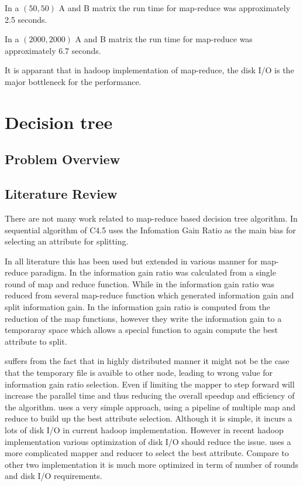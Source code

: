 \documentclass{article}
\begin{document}
In a $(50,50)$ A and B matrix the run time for map-reduce was approximately 2.5 seconds.

In a $(2000,2000)$ A and B matrix the run time for map-reduce was approximately 6.7 seconds.

It is apparant that in hadoop implementation of map-reduce, the disk I/O is the major bottleneck for the performance.

\section{Decision tree}

\subsection{Problem Overview}
\subsection{Literature Review}
There are not many work related to map-reduce based decision tree algorithm. 
\BlankLine In sequential algorithm of C4.5 uses the Infomation Gain Ratio as the main bias for selecting an attribute for splitting. 

In all literature this has been used but extended in various manner for map-reduce paradigm. In \cite{c452017} the information gain ratio was calculated from a single round of map and reduce function. While in \cite{c45cn} the information gain ratio was reduced from several map-reduce function which generated information gain and split information gain. In \cite {c45in} the information gain ratio is computed from the reduction of the map functions, however they write the information gain to a temporaray space which allows a special function to again compute the best attribute to split.

\cite{c45in} suffers from the fact that in highly distributed manner it might not be the case that the temporary file is avaible to other node, leading to wrong value for information gain ratio selection. Even if limiting the mapper to step forward will increase the parallel time and thus reducing the overall speedup and efficiency of the algorithm. \cite{c45cn} uses a very simple approach, using a pipeline of multiple map and reduce to build up the best attribute selection. Although it is simple, it incurs a lots of disk I/O in current hadoop implementation. However in recent hadoop implementation various optimization of disk I/O should reduce the issue. \cite{c452017} uses a more complicated mapper and reducer to select the best attribute. Compare to other two implementation it is much more optimized in term of number of rounds and disk I/O requirements.
\end{document}
